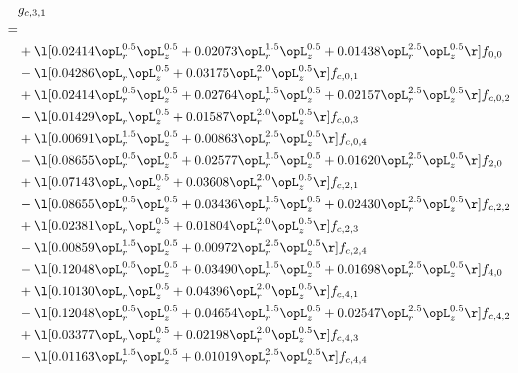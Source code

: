 \begin{alignat}{2} 
\label{eq:g_31_0} 
& g_{c,3,1} \nonumber \\ 
 = \\ 
& + \l[  0.02414 \opL_r^{0.5} \opL_z^{0.5} +  0.02073 \opL_r^{1.5} \opL_z^{0.5} +  0.01438 \opL_r^{2.5} \opL_z^{0.5}  \r] f_{0,0} \nonumber \\ 
& - \l[  0.04286 \opL_r \opL_z^{0.5} +  0.03175 \opL_r^{2.0} \opL_z^{0.5}  \r] f_{c,0,1} \nonumber \\ 
& + \l[  0.02414 \opL_r^{0.5} \opL_z^{0.5} +  0.02764 \opL_r^{1.5} \opL_z^{0.5} +  0.02157 \opL_r^{2.5} \opL_z^{0.5}  \r] f_{c,0,2} \nonumber \\ 
& - \l[  0.01429 \opL_r \opL_z^{0.5} +  0.01587 \opL_r^{2.0} \opL_z^{0.5}  \r] f_{c,0,3} \nonumber \\ 
& + \l[  0.00691 \opL_r^{1.5} \opL_z^{0.5} +  0.00863 \opL_r^{2.5} \opL_z^{0.5}  \r] f_{c,0,4} \nonumber \\ 
& - \l[  0.08655 \opL_r^{0.5} \opL_z^{0.5} +  0.02577 \opL_r^{1.5} \opL_z^{0.5} +  0.01620 \opL_r^{2.5} \opL_z^{0.5}  \r] f_{2,0} \nonumber \\ 
& + \l[  0.07143 \opL_r \opL_z^{0.5} +  0.03608 \opL_r^{2.0} \opL_z^{0.5}  \r] f_{c,2,1} \nonumber \\ 
& - \l[  0.08655 \opL_r^{0.5} \opL_z^{0.5} +  0.03436 \opL_r^{1.5} \opL_z^{0.5} +  0.02430 \opL_r^{2.5} \opL_z^{0.5}  \r] f_{c,2,2} \nonumber \\ 
& + \l[  0.02381 \opL_r \opL_z^{0.5} +  0.01804 \opL_r^{2.0} \opL_z^{0.5}  \r] f_{c,2,3} \nonumber \\ 
& - \l[  0.00859 \opL_r^{1.5} \opL_z^{0.5} +  0.00972 \opL_r^{2.5} \opL_z^{0.5}  \r] f_{c,2,4} \nonumber \\ 
& - \l[  0.12048 \opL_r^{0.5} \opL_z^{0.5} +  0.03490 \opL_r^{1.5} \opL_z^{0.5} +  0.01698 \opL_r^{2.5} \opL_z^{0.5}  \r] f_{4,0} \nonumber \\ 
& + \l[  0.10130 \opL_r \opL_z^{0.5} +  0.04396 \opL_r^{2.0} \opL_z^{0.5}  \r] f_{c,4,1} \nonumber \\ 
& - \l[  0.12048 \opL_r^{0.5} \opL_z^{0.5} +  0.04654 \opL_r^{1.5} \opL_z^{0.5} +  0.02547 \opL_r^{2.5} \opL_z^{0.5}  \r] f_{c,4,2} \nonumber \\ 
& + \l[  0.03377 \opL_r \opL_z^{0.5} +  0.02198 \opL_r^{2.0} \opL_z^{0.5}  \r] f_{c,4,3} \nonumber \\ 
& - \l[  0.01163 \opL_r^{1.5} \opL_z^{0.5} +  0.01019 \opL_r^{2.5} \opL_z^{0.5}  \r] f_{c,4,4} \nonumber \\ 
\end{alignat} 


